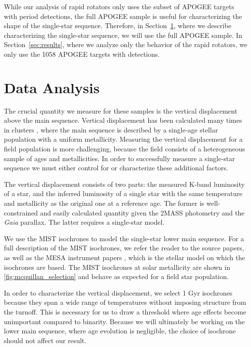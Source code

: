 \documentclass[manuscript]{aastex6}
\newcommand{\Gaia}{\mbox{\textit{Gaia}}}
\begin{document}
While our analysis of rapid rotators only uses the subset of APOGEE targets
with period detections, the full APOGEE sample is useful for characterizing the
shape of the single-star sequence. Therefore, in Section~\ref{sec:analysis},
where we describe characterizing the single-star sequence, we will use the full
APOGEE sample. In Section~\ref{sec:results}, where we analyze only the behavior
of the rapid rotators, we only use the 1058 APOGEE targets with
\citet{McQuillan14} detections.

\section{Data Analysis}
\label{sec:analysis}

The crucial quantity we measure for these samples is the vertical displacement
above the main sequence. Vertical displacement has been calculated many times
in clusters \citep{Mermilliod92}, where the main sequence is described by a
single-age stellar population with a uniform metallicity. Measuring the
vertical displacement for a field population is more challenging, because the
field consists of a heterogeneous sample of ages and metallicities. In order to
successfully measure a single-star sequence we must either control for or
characterize these additional factors. 

The vertical displacement consists of two parts: the measured K-band
luminosity of a star, and the inferred luminosity of a single star with the
same temperature and metallicity as the original one at a reference age. The 
former is well-constrained and easily calculated quantity given the 2MASS 
photometry and the \Gaia{} parallax. The latter requires a single-star model.

We use the MIST \citep{Dotter16,Choi16} isochrones to model the 
single-star lower main sequence. For a full description of the MIST 
isochrones, we refer the reader to the source papers, as well as the MESA 
instrument papers \citep{Paxton11, Paxton13, Paxton15}, which is the stellar 
model on which the isochrones are based. The MIST isochrones at solar
metallicity are shown in \cref{fig:mcquillan_selection} and behave as expected for a field
star population.

In order to characterize the vertical displacement, we select 1 Gyr isochrones 
because they span a wide range of temperatures without imposing
structure from the turnoff. This is necessary for us to draw a threshold where 
age effects become unimportant compared to binarity. Because we will 
ultimately be working on the lower main sequence, where age evolution is 
negligible, the choice of isochrone should not affect our result. 
\end{document}
